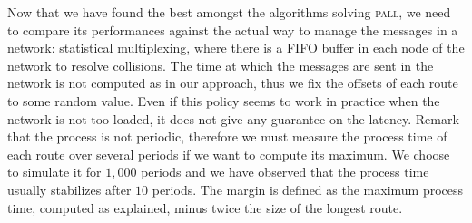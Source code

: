\documentclass[10pt, conference, letterpaper]{IEEEtran}
\newcommand{\todo}[1]{{\color{red} TODO: {#1}}}
\newcommand\pall{\textsc{pall}\xspace}
\begin{document}
%    
%     
%     
     
     Now that we have found the best amongst the algorithms solving \pall, we need to compare its performances against the actual way to manage the messages in a network:  statistical multiplexing, where there is a FIFO buffer in each node of the network to resolve collisions. The time at which the messages are sent in the network is not computed as in our approach, thus we fix the offsets of each route to some random value.
     Even if this policy seems to work in practice when the network is not too loaded, it does not give any guarantee on the latency. Remark that the process is not periodic, therefore we must measure the process time of each route over several periods if we want to compute its maximum. We choose to simulate it for $1,000$ periods and we have observed that the process time usually stabilizes after $10$ periods. The margin is defined as the maximum process time, computed as explained, minus twice the size of the longest route. 
	    
\end{document}
